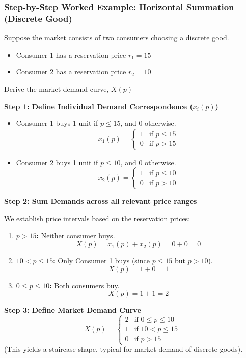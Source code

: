 \documentclass{article}
\begin{document}
\subsubsection*{Step-by-Step Worked Example: Horizontal Summation (Discrete Good)}

Suppose the market consists of two consumers choosing a discrete good.
\begin{itemize}
    \item Consumer 1 has a reservation price $r_1 = 15$
    \item Consumer 2 has a reservation price $r_2 = 10$
\end{itemize}
Derive the market demand curve, $X(p)$

\textbf{Step 1: Define Individual Demand Correspondence ($x_i(p)$)}
\begin{itemize}
    \item Consumer 1 buys 1 unit if $p \leq 15$, and 0 otherwise. 
    \[ x_1(p) = \begin{cases} 1 & \text{if } p \leq 15 \\ 0 & \text{if } p > 15 \end{cases} \]
    \item Consumer 2 buys 1 unit if $p \leq 10$, and 0 otherwise. 
    \[ x_2(p) = \begin{cases} 1 & \text{if } p \leq 10 \\ 0 & \text{if } p > 10 \end{cases} \]
\end{itemize}

\textbf{Step 2: Sum Demands across all relevant price ranges} 

We establish price intervals based on the reservation prices:
\begin{enumerate}
    \item \textbf{$p > 15$:} Neither consumer buys. 
    \[ X(p) = x_1(p) + x_2(p) = 0 + 0 = 0 \]
    \item \textbf{$10 < p \leq 15$:} Only Consumer 1 buys (since $p \leq 15$ but $p > 10$). 
    \[ X(p) = 1 + 0 = 1 \]
    \item \textbf{$0 \leq p \leq 10$:} Both consumers buy. 
    \[ X(p) = 1 + 1 = 2 \]
\end{enumerate}

\textbf{Step 3: Define Market Demand Curve}
\[ X(p) = \begin{cases} 2 & \text{if } 0 \leq p \leq 10 \\ 1 & \text{if } 10 < p \leq 15 \\ 0 & \text{if } p > 15 \end{cases} \]
(This yields a staircase shape, typical for market demand of discrete goods).
\end{document}
